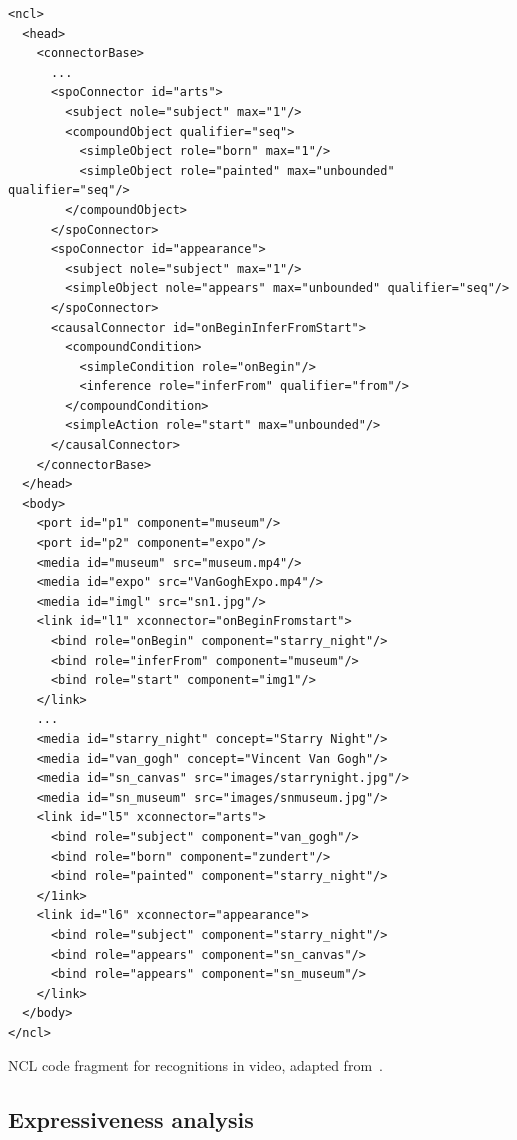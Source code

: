 \documentclass[
  doutorado,
  american
]{ThesisPUC}
\newcommand{\captionvspace}{\vspace{-1.3em}}
\begin{document}
\begin{verbatim}
<ncl>
  <head>
    <connectorBase>
      ...
      <spoConnector id="arts">
        <subject nole="subject" max="1"/>
        <compoundObject qualifier="seq">
          <simpleObject role="born" max="1"/>
          <simpleObject role="painted" max="unbounded" qualifier="seq"/>
        </compoundObject>
      </spoConnector>
      <spoConnector id="appearance">
        <subject nole="subject" max="1"/>
        <simpleObject nole="appears" max="unbounded" qualifier="seq"/>
      </spoConnector>
      <causalConnector id="onBeginInferFromStart">
        <compoundCondition>
          <simpleCondition role="onBegin"/>
          <inference role="inferFrom" qualifier="from"/>
        </compoundCondition>
        <simpleAction role="start" max="unbounded"/>
      </causalConnector>
    </connectorBase>
  </head>
  <body>
    <port id="p1" component="museum"/>
    <port id="p2" component="expo"/>
    <media id="museum" src="museum.mp4"/>
    <media id="expo" src="VanGoghExpo.mp4"/>
    <media id="imgl" src="sn1.jpg"/>
    <link id="l1" xconnector="onBeginFromstart">
      <bind role="onBegin" component="starry_night"/>
      <bind role="inferFrom" component="museum"/>
      <bind role="start" component="img1"/>
    </link>
    ...
    <media id="starry_night" concept="Starry Night"/>
    <media id="van_gogh" concept="Vincent Van Gogh"/>
    <media id="sn_canvas" src="images/starrynight.jpg"/>
    <media id="sn_museum" src="images/snmuseum.jpg"/>
    <link id="l5" xconnector="arts">
      <bind role="subject" component="van_gogh"/>
      <bind role="born" component="zundert"/>
      <bind role="painted" component="starry_night"/>
    </1ink>
    <link id="l6" xconnector="appearance">
      <bind role="subject" component="starry_night"/>
      <bind role="appears" component="sn_canvas"/>
      <bind role="appears" component="sn_museum"/>
    </link>
  </body>
</ncl>
\end{verbatim}

\begin{listing}[!ht]
    \caption[NCL code fragment for recognitions in video]{NCL code fragment for recognitions in video, adapted from~\cite{moreno_extending_2017}.}
    \captionvspace
    \label{list:moreno}
\end{listing}

\subsection{Expressiveness analysis}
\label{sec:state:allen}
\end{document}

